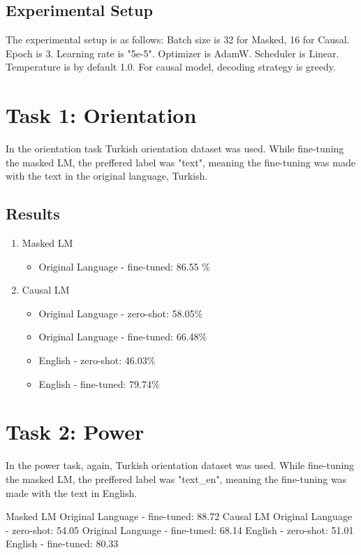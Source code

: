 \documentclass[
]{ceurart}
\begin{document}
\subsection{Experimental Setup}

The experimental setup is as follows: Batch size is 32 for Masked, 16 for Causal. Epoch is 3. Learning rate is "5e-5". Optimizer is AdamW. Scheduler is Linear. Temperature is by default 1.0. For causal model, decoding strategy is greedy.

\section{Task 1: Orientation}

In the orientation task Turkish orientation dataset was used. While fine-tuning the masked LM, the preffered label was "text", meaning the fine-tuning was made with the text in the original language, Turkish.

\subsection{Results}
\begin{enumerate}
    \item Masked LM
    \begin{itemize}
        \item Original Language - fine-tuned: 86.55 \%
    \end{itemize}
    \item Causal LM
    \begin{itemize}
        \item Original Language - zero-shot: 58.05\%
        \item Original Language - fine-tuned: 66.48\%
        \item English - zero-shot: 46.03\%
        \item English - fine-tuned: 79.74\%
    \end{itemize}
\end{enumerate}


\section{Task 2: Power}


In the power task, again, Turkish orientation dataset was used. While fine-tuning the masked LM, the preffered label was "text\_en", meaning the fine-tuning was made with the text in English.

Masked LM
Original Language - fine-tuned: 88.72 %
Causal LM
Original Language - zero-shot: 54.05%
Original Language - fine-tuned: 68.14%
English - zero-shot: 51.01%
English - fine-tuned: 80.33%
\end{document}

